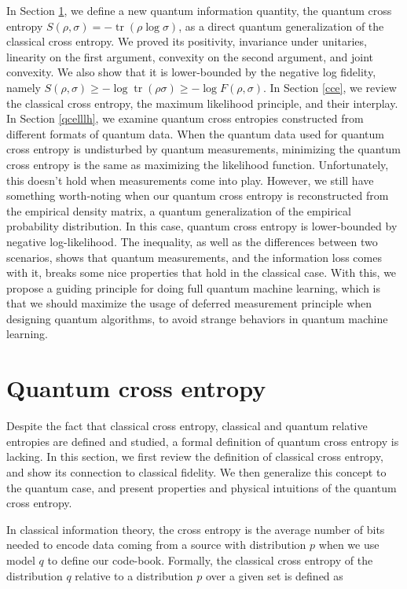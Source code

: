 \documentclass[11pt]{article}
\theoremstyle{definition}
\DeclareMathOperator{\tr}{\text{tr}}
\begin{document}
In Section \ref{qce}, we define a new quantum information quantity, the quantum cross entropy $S(\rho, \sigma) =  -\tr(\rho \log \sigma)$, as a direct quantum generalization of the classical cross entropy. We proved its positivity, invariance under unitaries, linearity on the first argument, convexity on the second argument, and joint convexity.
We also show that it is lower-bounded by the negative log fidelity, namely $S(\rho, \sigma) \geq -\log \tr (\rho \sigma)\geq -\log F(\rho,\sigma)$.
In Section \ref{cce}, we review the classical cross entropy, the maximum likelihood principle, and their interplay.
In Section \ref{qcelllh}, we examine quantum cross entropies constructed from different formats of quantum data. When the quantum data used for quantum cross entropy is undisturbed by quantum measurements, minimizing the quantum cross entropy is the same as maximizing the likelihood function. Unfortunately, this doesn't hold when measurements come into play. However, we still have something worth-noting when our quantum cross entropy is reconstructed from the empirical density matrix, a quantum generalization of the empirical probability distribution. In this case, quantum cross entropy is lower-bounded by negative log-likelihood. The inequality, as well as the differences between two scenarios, shows that quantum measurements, and the information loss comes with it, breaks some nice properties that hold in the classical case. With this, we propose a guiding principle for doing full quantum machine learning, which is that we should maximize the usage of deferred measurement principle when designing quantum algorithms, to avoid strange behaviors \cite{Barren} in quantum machine learning. 



\section{Quantum cross entropy}\label{qce}

Despite the fact that classical cross entropy, classical and quantum relative entropies are defined and studied, a formal definition of quantum cross entropy is lacking. In this section, we first review the definition of classical cross entropy, and show its connection to classical fidelity. We then generalize this concept to the quantum case, and present properties and physical intuitions of the quantum cross entropy.

In classical information theory, the cross entropy is the average number of bits needed to encode data coming from a source with distribution $p$ when we use model $q$ to define our code-book. 
Formally, the classical cross entropy of the distribution $q$ relative to a distribution $p$ over a given set is defined as \cite{MLbookcross}
\end{document}
